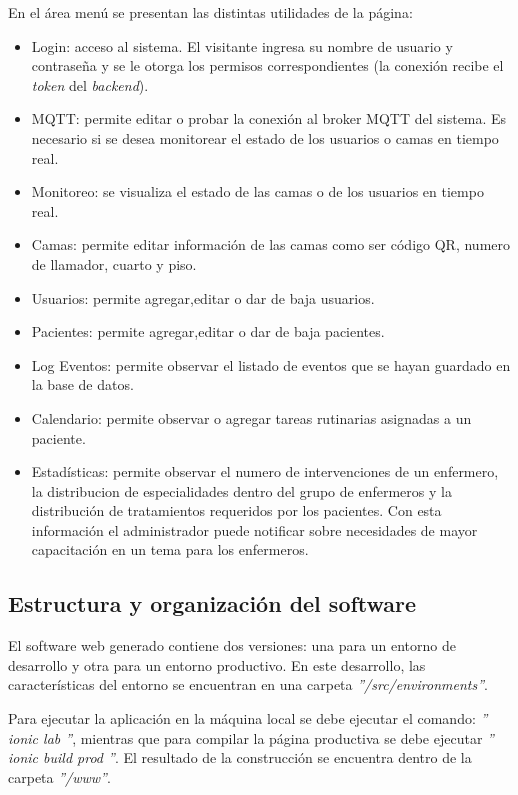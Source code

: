 En el área menú se presentan las distintas utilidades de la página:
\begin{itemize}
\item Login: acceso al sistema. El visitante ingresa su nombre de usuario y contraseña y se le otorga los permisos correspondientes (la conexión recibe el \textit{token} del \textit{backend}).
\item MQTT: permite editar o probar la conexión al broker MQTT del sistema. Es necesario si se desea monitorear el estado de los usuarios o camas en tiempo real.
\item Monitoreo: se visualiza el estado de las camas o de los usuarios en tiempo real.
\item Camas: permite editar información de las camas como ser código QR, numero de llamador, cuarto y piso.
\item Usuarios: permite agregar,editar o dar de baja usuarios.
\item Pacientes: permite agregar,editar o dar de baja pacientes.
\item Log Eventos: permite observar el listado de eventos que se hayan guardado en la base de datos.
\item Calendario: permite observar o agregar tareas rutinarias asignadas a un paciente.
\item Estadísticas: permite observar el numero de intervenciones de un enfermero, la distribucion de especialidades dentro del grupo de enfermeros y la distribución de tratamientos requeridos por los pacientes. Con esta información el administrador puede notificar sobre necesidades de mayor capacitación en un tema para los enfermeros.
\end{itemize}


\subsection{Estructura y organización del software}

El software web generado contiene dos versiones: una para un entorno de desarrollo y otra para un entorno productivo. En este desarrollo, las características del entorno se encuentran en una carpeta \textit{''/src/environments''}. 

Para ejecutar la aplicación en la máquina local se debe ejecutar el comando:  \textit{'' ionic lab ''}, mientras que para compilar la página productiva se debe ejecutar \textit{'' ionic build prod ''}. El resultado de la construcción se encuentra dentro de la carpeta \textit{''/www''}.

